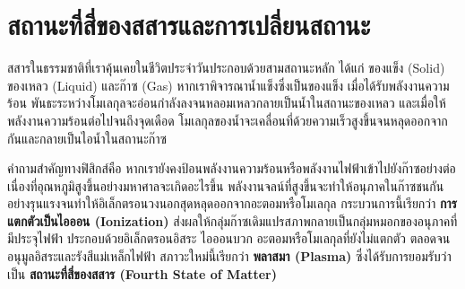 \section{สถานะที่สี่ของสสารและการเปลี่ยนสถานะ}

สสารในธรรมชาติที่เราคุ้นเคยในชีวิตประจำวันประกอบด้วยสามสถานะหลัก ได้แก่ ของแข็ง (Solid) ของเหลว (Liquid) และก๊าซ (Gas) หากเราพิจารณาน้ำแข็งซึ่งเป็นของแข็ง เมื่อได้รับพลังงานความร้อน พันธะระหว่างโมเลกุลจะอ่อนกำลังลงจนหลอมเหลวกลายเป็นน้ำในสถานะของเหลว และเมื่อให้พลังงานความร้อนต่อไปจนถึงจุดเดือด โมเลกุลของน้ำจะเคลื่อนที่ด้วยความเร็วสูงขึ้นจนหลุดออกจากกันและกลายเป็นไอน้ำในสถานะก๊าซ

คำถามสำคัญทางฟิสิกส์คือ หากเรายังคงป้อนพลังงานความร้อนหรือพลังงานไฟฟ้าเข้าไปยังก๊าซอย่างต่อเนื่องที่อุณหภูมิสูงขึ้นอย่างมหาศาลจะเกิดอะไรขึ้น พลังงานจลน์ที่สูงขึ้นจะทำให้อนุภาคในก๊าซชนกันอย่างรุนแรงจนทำให้อิเล็กตรอนวงนอกสุดหลุดออกจากอะตอมหรือโมเลกุล กระบวนการนี้เรียกว่า \textbf{การแตกตัวเป็นไอออน (Ionization)} ส่งผลให้กลุ่มก๊าซเดิมแปรสภาพกลายเป็นกลุ่มหมอกของอนุภาคที่มีประจุไฟฟ้า ประกอบด้วยอิเล็กตรอนอิสระ ไอออนบวก อะตอมหรือโมเลกุลที่ยังไม่แตกตัว ตลอดจนอนุมูลอิสระและรังสีแม่เหล็กไฟฟ้า สภาวะใหม่นี้เรียกว่า \textbf{พลาสมา (Plasma)} ซึ่งได้รับการยอมรับว่าเป็น \textbf{สถานะที่สี่ของสสาร (Fourth State of Matter)}

